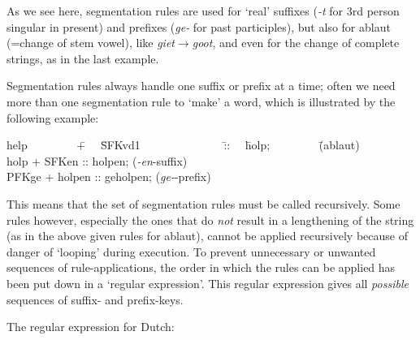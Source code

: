 As we see here, segmentation rules are used for `real' suffixes ({\em -t} for
3rd person singular in present) and prefixes ({\em ge-} for past participles),
but also for ablaut (=change of stem vowel), like 
{\em giet}$\longrightarrow${\em goot}, 
and even for the change of complete strings, as in the last example.

Segmentation rules always handle one suffix or prefix at a time;
often we need more than one segmentation rule to `make' a word, which is
illustrated by the following example:

\begin{tabbing}
help  \ \ \ \ \ \ \ \   \= + \ \  \= SFKvd1  \ \ \ \ \ \ \ \ \ \ \ \ \ \    
\= :: \ \  \= holp; \ \ \ \ \ \ \ \   \= (ablaut)       \\
holp   \> + \> SFKen  \> :: \> holpen;   \> ({\em -en}-suffix) \\
PFKge  \> + \> holpen \> :: \> geholpen; \> ({\em ge-}-prefix) \\
\end{tabbing}

This means that the set of segmentation rules must be called recursively.
Some rules however, especially the ones that do {\em not} 
result in a lengthening
of the string (as in the above given rules for ablaut), cannot be applied
recursively because of danger of `looping' during execution. 
To prevent unnecessary or unwanted sequences of rule-applications,
the order in which the rules can be applied has been put down in a 
`regular expression'. This regular expression gives all {\em possible}
sequences of suffix- and prefix-keys. 

The regular expression for Dutch: 

